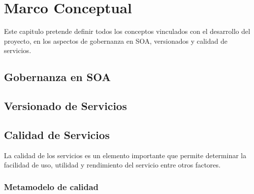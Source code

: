 \documentclass[a4paper,openright,12pt]{report}
\begin{document}
\chapter{Marco Conceptual}
Este capitulo pretende definir todos los conceptos vinculados con el desarrollo del proyecto, en los aspectos de gobernanza en SOA, versionados y calidad de servicios.
\section{Gobernanza en SOA}
\section{Versionado de Servicios}
\section{Calidad de Servicios}
La calidad de los servicios es un elemento importante que permite determinar la facilidad de uso, utilidad y rendimiento del servicio entre otros factores.
\subsection{Metamodelo de calidad}




\end{document}
